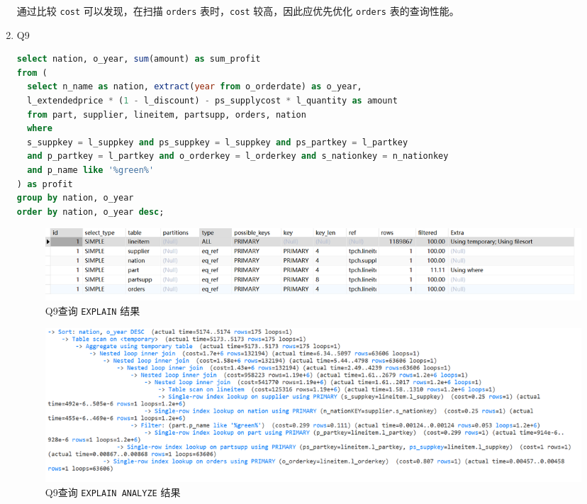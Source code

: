 \documentclass{article}
\renewcommand\tt{\texttt}
\begin{document}
\begin{enumerate}
通过比较 \tt{cost} 可以发现，在扫描 \tt{orders} 表时，\tt{cost} 较高，因此应优先优化 \tt{orders} 表的查询性能。

\item Q9
\begin{lstlisting}[language=sql]
select nation, o_year, sum(amount) as sum_profit 
from ( 
  select n_name as nation, extract(year from o_orderdate) as o_year, 
  l_extendedprice * (1 - l_discount) - ps_supplycost * l_quantity as amount 
  from part, supplier, lineitem, partsupp, orders, nation 
  where 
  s_suppkey = l_suppkey and ps_suppkey = l_suppkey and ps_partkey = l_partkey 
  and p_partkey = l_partkey and o_orderkey = l_orderkey and s_nationkey = n_nationkey 
  and p_name like '%green%' 
) as profit 
group by nation, o_year 
order by nation, o_year desc;
\end{lstlisting}

\begin{figure}[H]
\centering
\includegraphics[width=1\textwidth]{img/17.png}
\caption{Q9查询 \tt{EXPLAIN} 结果}
\end{figure}

\begin{figure}[H]
\centering
\includegraphics[width=1\textwidth]{img/18.png}
\caption{Q9查询 \tt{EXPLAIN ANALYZE} 结果}
\end{figure}


\end{enumerate}
\end{document}
